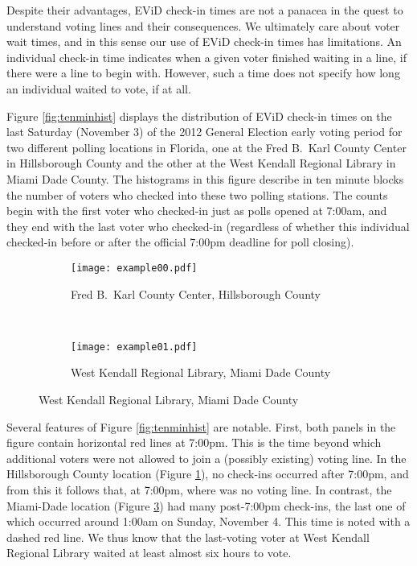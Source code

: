 \documentclass[12pt,titlepage]{article}
\begin{document}
Despite their advantages, EViD check-in times are not a panacea in the
quest to understand voting lines and their consequences.  We
ultimately care about voter wait times, and in this sense our use of
EViD check-in times has limitations.  An individual check-in time
indicates when a given voter finished waiting in a line, if there were
a line to begin with.  However, such a time does not specify how long
an individual waited to vote, if at all.  


Figure \ref{fig:tenminhist} displays the distribution of EViD check-in
times on the last Saturday (November 3) of the 2012 General Election
early voting period for two different polling locations in Florida,
one at the Fred B.\ Karl County Center in Hillsborough County and the
other at the West Kendall Regional Library in Miami Dade County.  The
histograms in this figure describe in ten minute blocks the number of
voters who checked into these two polling stations.  The counts begin
with the first voter who checked-in just as polls opened at 7:00am,
and they end with the last voter who checked-in (regardless of whether
this individual checked-in before or after the official 7:00pm
deadline for poll closing).

\begin{figure}[!ht]
  \caption{Early voting check-in times on Saturday, November 3, 2012, in two Florida locations}
  \label{fig:tenminhist}
  \centering
  \begin{subfigure}[b]{\linewidth}
    \centering\texttt{[image: example00.pdf]}
    \caption{Fred B.\ Karl County Center, Hillsborough County}
    \label{fig:karlexample}
  \end{subfigure}%
  \\
  \begin{subfigure}[b]{\linewidth}
    \centering\texttt{[image: example01.pdf]}
    \caption{West Kendall Regional Library, Miami Dade County}
    \label{fig:kendallexample}
  \end{subfigure}
\end{figure}

Several features of Figure \ref{fig:tenminhist} are notable.  First,
both panels in the figure contain horizontal red lines at 7:00pm.
This is the time beyond which additional voters were not allowed to
join a (possibly existing) voting line.  In the Hillsborough County
location (Figure \ref{fig:karlexample}), no check-ins occurred after
7:00pm, and from this it follows that, at 7:00pm, where was no voting
line.  In contrast, the Miami-Dade location (Figure
\ref{fig:kendallexample}) had many post-7:00pm check-ins, the last one
of which occurred around 1:00am on Sunday, November 4.  This time is
noted with a dashed red line.  We thus know that the last-voting voter
at West Kendall Regional Library waited at least almost six hours to
vote.
\end{document}

